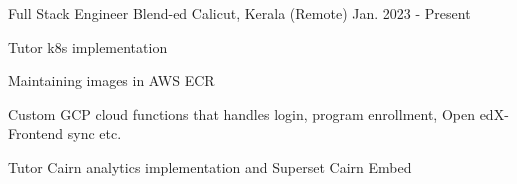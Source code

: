 \begin{cventries}
  \cventry
    {Full Stack Engineer } %
    {Blend-ed} %
    {Calicut, Kerala (Remote)} %
    {Jan. 2023 - Present} %
    {
      \begin{cvitems} %
        \item Tutor k8s implementation
        \item Maintaining images in AWS ECR
        \item Custom GCP cloud functions that handles login, program enrollment, Open edX-Frontend sync etc.
        \item Tutor Cairn analytics implementation and Superset Cairn Embed
      \end{cvitems}
    } 
\end{cventries}
